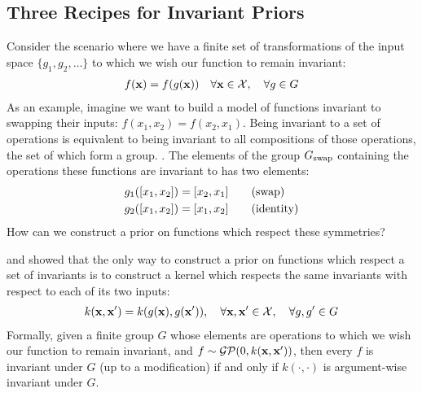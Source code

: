 \subsection{Three Recipes for Invariant Priors}

Consider the scenario where we have a finite set of transformations of the input space $\{g_1, g_2, \ldots \}$ to which we wish our function to remain invariant:
%
\begin{align}
f({\bf{x}}) = f(g({\bf{x}}))  \quad \forall {\bf{x}} \in \mathcal{X}, \quad \forall g \in G
\end{align}
%
As an example, imagine we want to build a model of functions invariant to swapping their inputs: $f(x_1, x_2) = f(x_2, x_1)$.
Being invariant to a set of operations is equivalent to being invariant to all compositions of those operations, the set of which form a group. \citep[chapter 21]{armstrong1988groups}.
The elements of the group $G_\textnormal{swap}$ containing the operations these functions are invariant to has two elements:%
%
\begin{align}
g_1([x_1, x_2]) & = [x_2, x_1] \qquad \textnormal{(swap)} \\
g_2([x_1, x_2]) & = [x_1, x_2] \qquad \textnormal{(identity)}
\end{align}
%
How can we construct a prior on functions which respect these symmetries?

\citet{ginsbourger2012argumentwise} and \citet{Invariances13} showed that the only way to construct a \gp{} prior on functions which respect a set of invariants is to construct a kernel which respects the same invariants with respect to each of its two inputs:
%
\begin{align}
k({\bf{x}}, {\bf{x}}') = k( g({\bf{x}}), g({\bf{x}}')), \quad \forall {\bf{x}}, {\bf{x}}' \in \mathcal{X}, \quad \forall g, g' \in G
\end{align}
%
Formally, given a finite group $G$ whose elements are operations to which we wish our function to remain invariant, and $f \sim \mathcal{GP}\!\left(0,k({\bf{x}},{\bf{x}}')\right)$, then every $f$ is invariant under $G$ (up to a modification) if and only if $k(\cdot, \cdot)$ is argument-wise invariant under $G$.

